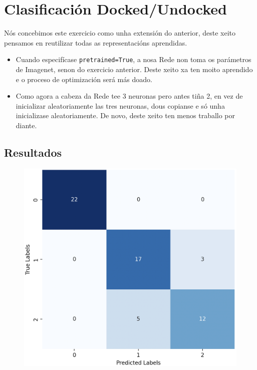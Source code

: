 \documentclass{article}
\begin{document}
\section{Clasificación Docked/Undocked}

Nós concebimos este exercicio como unha extensión do anterior, deste xeito pensamos en reutilizar todas as representacións aprendidas.
\begin{itemize}
	\item Cuando especifícase \texttt{pretrained=True}, a nosa Rede non toma os parámetros de Imagenet, senon do exercicio anterior. Deste xeito xa ten moito aprendido e o proceso de optimización será más doado.
	\item Como agora a cabeza da Rede tee 3 neuronas pero antes tiña 2, en vez de inicializar aleatoriamente las tres neuronas, dous copianse e só unha inicializase aleatoriamente. De novo, deste xeito ten menos traballo por diante.
\end{itemize}

\subsection{Resultados}

\begin{figure}
	\includegraphics[width=1\linewidth]{cmEj2} 
	\label{fig:cmEj2}
\end{figure}
\end{document}
